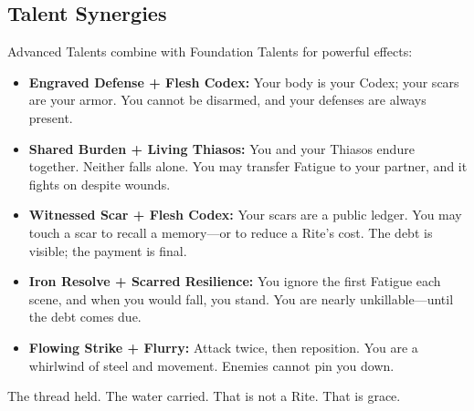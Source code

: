 \subsection{Talent Synergies}

Advanced Talents combine with Foundation Talents for powerful effects:

\begin{itemize}
\item \textbf{Engraved Defense + Flesh Codex:} Your body is your Codex; your scars are your armor. You cannot be disarmed, and your defenses are always present.
\item \textbf{Shared Burden + Living Thiasos:} You and your Thiasos endure together. Neither falls alone. You may transfer Fatigue to your partner, and it fights on despite wounds.
\item \textbf{Witnessed Scar + Flesh Codex:} Your scars are a public ledger. You may touch a scar to recall a memory—or to reduce a Rite's cost. The debt is visible; the payment is final.
\item \textbf{Iron Resolve + Scarred Resilience:} You ignore the first Fatigue each scene, and when you would fall, you stand. You are nearly unkillable—until the debt comes due.
\item \textbf{Flowing Strike + Flurry:} Attack twice, then reposition. You are a whirlwind of steel and movement. Enemies cannot pin you down.
\end{itemize}

The thread held. The water carried. That is not a Rite. That is grace.
